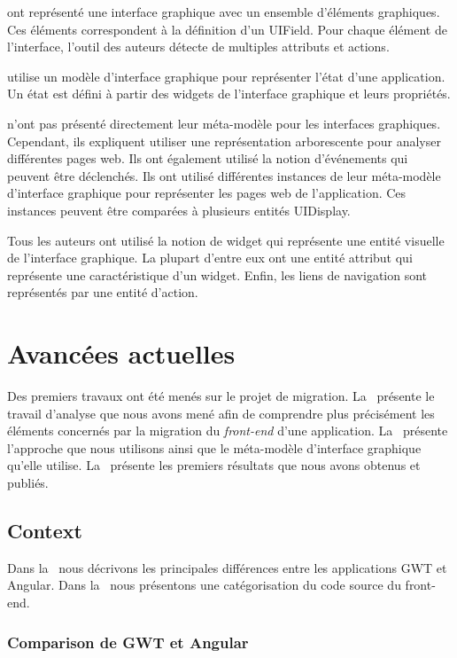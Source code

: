 \documentclass[a4paper]{article}
\begin{document}
\citet{Joor12a} ont représenté une interface graphique avec un ensemble d'éléments graphiques.
Ces éléments correspondent à la définition d'un UIField.
Pour chaque élément de l'interface, l'outil des auteurs détecte de multiples attributs et actions.

\citet{Memo07a} utilise un modèle d'interface graphique pour représenter l'état d'une application.
Un état est défini à partir des widgets de l'interface graphique et leurs propriétés.

\citet{Mesb12a} n'ont pas présenté directement leur méta-modèle pour les interfaces graphiques.
Cependant, ils expliquent utiliser une représentation arborescente pour analyser différentes pages web.
Ils ont également utilisé la notion d'événements qui peuvent être déclenchés.
Ils ont utilisé différentes instances de leur méta-modèle d'interface graphique pour représenter les pages web de l'application.
Ces instances peuvent être comparées à plusieurs entités UIDisplay.

Tous les auteurs ont utilisé la notion de widget qui représente une entité visuelle de l'interface graphique.
La plupart d'entre eux ont une entité attribut qui représente une caractéristique d'un widget.
Enfin, les liens de navigation sont représentés par une entité d'action.

\section{Avancées actuelles}

Des premiers travaux ont été menés sur le projet de migration.
La~ présente le travail d'analyse que nous avons mené afin de comprendre plus précisément les éléments concernés par la migration du \textit{front-end} d'une application.
La~ présente l'approche que nous utilisons ainsi que le méta-modèle d'interface graphique qu'elle utilise.
La~ présente les premiers résultats que nous avons obtenus et publiés.

\subsection{Context}
\label{sec:context}

Dans la~ nous décrivons les principales différences entre les applications GWT et Angular.
Dans la~ nous présentons une catégorisation du code source du front-end.

\subsubsection{Comparison de GWT et Angular}
\label{sec:comparisonGwtAngular}
\end{document}
